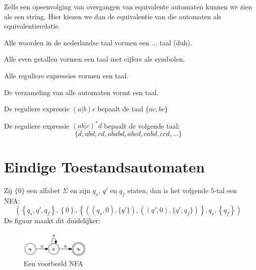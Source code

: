 \documentclass[main.tex]{subfiles}
\begin{document}
\begin{vb}
  Zelfs een opeenvolging van overgangen van equivalente automaten kunnen we zien als een string.
  Hier kiezen we dan de equivalentie van die automaten als equivalentierelatie.
\end{vb}

\begin{vb}
  Alle woorden in de nederlandse taal vormen een ... taal (duh).
\end{vb}

\begin{vb}
  Alle even getallen vormen een taal met cijfers als symbolen.
\end{vb}

\begin{vb}
  Alle reguliere expressies vormen een taal.
\end{vb}

\begin{vb}
  De verzameling van alle automaten vormt een taal.
\end{vb}

\begin{vb}
  De reguliere expressie $(a|b)c$ bepaalt de taal $\{ac, bc\}$
\end{vb}

\begin{vb}
  De reguliere expressie $(ab|c)^{*}d$ bepaalt de volgende taal:
  \[ \{d, abd, cd, ababd, abcd, cabd, ccd, \dotsc \}\]
\end{vb}

\section{Eindige Toestandsautomaten}
\label{sec:eind-toestandsautomaten}

\begin{vb}
  Zij $\{ 0 \}$ een alfabet $\Sigma$ en zijn $q_{s}$, $q'$ en $q_{f}$ staten, dan is het volgende $5$-tal een NFA:
  \[ \left(\left\{q_{s},q',q_{f}\right\},\left\{0\right\},\left\{\left((q_{s},0),\{q'\}\right),\left((q',0),\{q',q_{f}\}\right)\right\},q_{s},\left\{q_{f}\right\} \right) \]
  De figuur maakt dit duidelijker:
  \begin{figure}[H]
    \centering
    \includegraphics[width=0.3\textwidth]{assets/nfa-vb1.png}
    \caption{Een voorbeeld NFA}
    \label{fig:nfa-vb1}
  \end{figure}
\end{vb}
\end{document}
